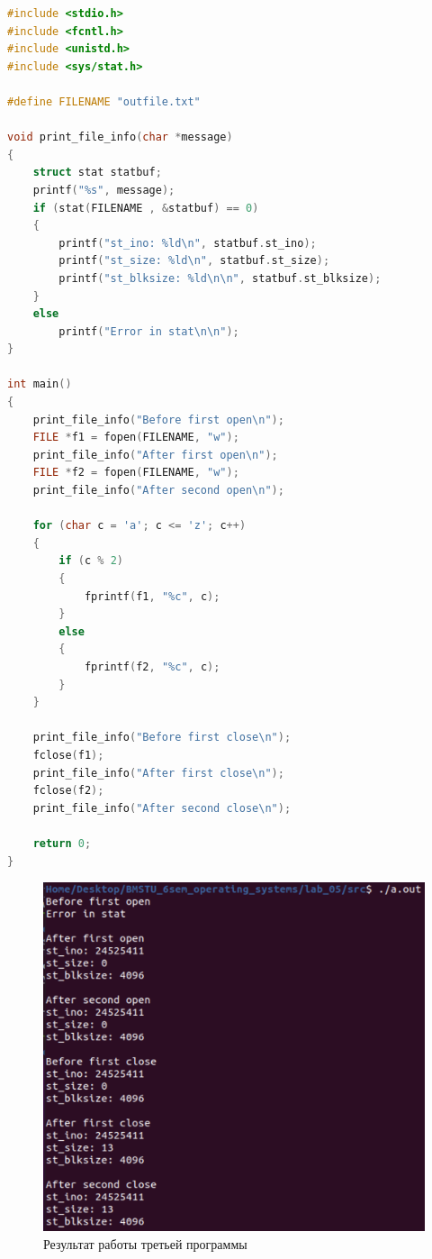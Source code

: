 \documentclass[12pt]{report}
\begin{document}
\begin{lstlisting}[language=c, label=p3, caption=Третья программа]
#include <stdio.h>
#include <fcntl.h>
#include <unistd.h>
#include <sys/stat.h>

#define FILENAME "outfile.txt"

void print_file_info(char *message)
{
    struct stat statbuf;
    printf("%s", message);
    if (stat(FILENAME , &statbuf) == 0)
    {
        printf("st_ino: %ld\n", statbuf.st_ino);
        printf("st_size: %ld\n", statbuf.st_size);
        printf("st_blksize: %ld\n\n", statbuf.st_blksize);
    }
    else
        printf("Error in stat\n\n");
}

int main()
{
    print_file_info("Before first open\n");
    FILE *f1 = fopen(FILENAME, "w");
    print_file_info("After first open\n");
    FILE *f2 = fopen(FILENAME, "w");
    print_file_info("After second open\n");

    for (char c = 'a'; c <= 'z'; c++)
    {
        if (c % 2)
        {
            fprintf(f1, "%c", c);
        }
        else
        {
            fprintf(f2, "%c", c);
        }
    }

    print_file_info("Before first close\n");
    fclose(f1);
    print_file_info("After first close\n");
    fclose(f2);
    print_file_info("After second close\n");

    return 0;
}

\end{lstlisting}


\begin{figure}[H]
	\centering
	\includegraphics[scale=0.6]{img/prog_03.png}
	\caption{Результат работы третьей программы}
	\label{fig:prog_03}
\end{figure}
\end{document}

